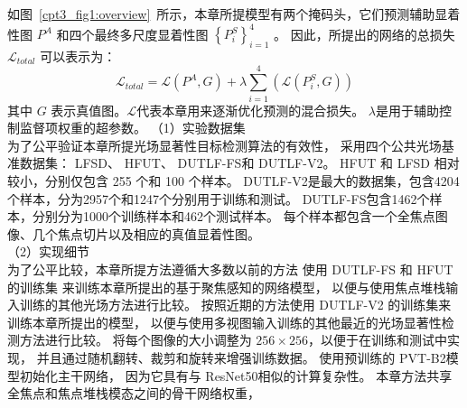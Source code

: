 %
%
如图~\ref{cpt3_fig1:overview}~所示，本章所提模型有两个掩码头，它们预测辅助显着性图 $ P^{A} $ 和四个最终多尺度显着性图 $ \left \{ P_{i}^{S} \right \}_{i=1}^{4} $ 。 因此，所提出的网络的总损失 $ \mathcal L_{total} $ 可以表示为： 
%
\begin{equation}
	\mathcal L_{total} = \mathcal L\left ( P^{A}, G \right ) + \lambda  \sum_{i=1}^{4} \left ( \mathcal L \left (  P_{i}^{S},G \right )\right )
	\label{chpt3:equ:loss_total}
\end{equation}
%
%
%
其中 $ G $ 表示真值图。$ \mathcal L $代表本章用来逐渐优化预测的混合损失。 $ \lambda $是用于辅助控制监督项权重的超参数。
（1）实验数据集
\\
%
%
%
%
\indent
为了公平验证本章所提光场显著性目标检测算法的有效性，
采用四个公共光场基准数据集：
LFSD、
HFUT、
DUTLF-FS和 
DUTLF-V2。 
HFUT 和 LFSD 相对较小，分别仅包含 255 个和 100 个样本。 
DUTLF-V2是最大的数据集，包含4204个样本，分为2957个和1247个分别用于训练和测试。 
DUTLF-FS包含1462个样本，分别分为1000个训练样本和462个测试样本。 
每个样本都包含一个全焦点图像、几个焦点切片以及相应的真值显着性图。
\\
%
%
%
%
\indent
（2）实现细节
\\
%
%
%
%
\indent
为了公平比较，本章所提方法遵循大多数以前的方法
使用 DUTLF-FS 和 HFUT 的训练集
来训练本章所提出的基于聚焦感知的网络模型，
以便与使用焦点堆栈输入训练的其他光场方法进行比较。 
按照近期的方法使用 DUTLF-V2 的训练集来训练本章所提出的模型，
以便与使用多视图输入训练的其他最近的光场显著性检测方法进行比较。 
将每个图像的大小调整为 $256 \times 256$，以便于在训练和测试中实现，
并且通过随机翻转、裁剪和旋转来增强训练数据。
使用预训练的 PVT-B2模型初始化主干网络，
因为它具有与 ResNet50相似的计算复杂性。 
本章方法共享全焦点和焦点堆栈模态之间的骨干网络权重，
